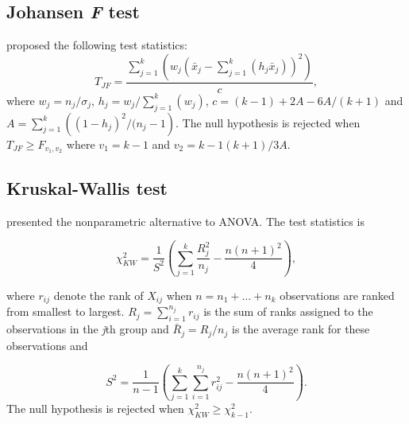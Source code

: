 \subsection{Johansen \textit{F} test}
\cite{johansen1980welch} proposed the following test statistics:
\begin{equation}
    T_{JF}=\frac{\sum_{j=1}^k(w_j(\bar{x}_j-\sum_{j=1}^k(h_j\bar{x}_j))^{2})}{c},
\end{equation}
where \begin{math} w_j=n_j/\sigma_j \end{math},
\begin{math} h_j=w_j/\sum\limits_{j=1}^k(w_j) \end{math}, \begin{math} c=(k-1)+2A-6A/(k+1) \end{math} and \begin{math}
    A=\displaystyle\sum\limits_{j=1}^k({(1-h_j)^{2}}/{(n_j-1})
\end{math}.
The null hypothesis is rejected when
\begin{math} T_{JF} \geqslant F_{v_{1},v_{2}} \end{math} where \begin{math} v_1=k-1 \end{math} and \begin{math} v_2=k-1(k+1)/3A \end{math}.



\subsection{Kruskal-Wallis test}

\citet{kruskal1952} presented the nonparametric alternative to ANOVA. The test statistics is

\begin{equation}\label{KW}
\chi_{KW}^2=\frac{1}{S^2}\left(\sum_{j=1}^k \frac{R_j^2}{n_j}-\frac{n(n+1)^2}{4}\right),
\end{equation}

\noindent where $r_{ij}$ denote the rank of $X_{ij}$ when $n=n_1+ \ldots +n_k$ observations are ranked from smallest to largest. $R_j=\sum_{i=1}^{n_j} r_{ij}$ is the sum of ranks assigned to the observations in the \textit{j}th group and $\bar{R}_j=R_j/n_j$ is the average rank for these observations and

\begin{equation*}
S^2=\frac{1}{n-1}\left(\sum_{j=1}^k \sum_{i=1}^{n_j} r_{ij}^2 - \frac{n(n+1)^2}{4}\right).
\end{equation*}
The null hypothesis is rejected when $\chi_{KW}^2\geq \chi_{k-1}^{2}$.

